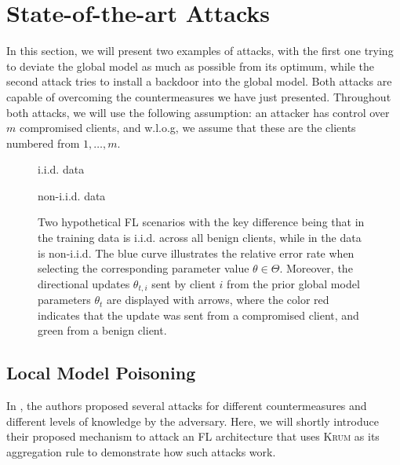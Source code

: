 \documentclass[conference]{IEEEtran}
\begin{document}
\section{State-of-the-art Attacks}\label{sec:attacks}
In this section, we will present two examples of attacks, with the first one trying to deviate the global model as much as possible from its optimum, while the second attack tries to install a backdoor into the global model. Both attacks are capable of overcoming the countermeasures we have just presented. Throughout both attacks, we will use the following assumption: an attacker has control over $m$ compromised clients, and w.l.o.g, we assume that these are the clients numbered from $1, \ldots, m$.

\begin{figure*}
    \centering
    \begin{minipage}[b]{0.49\textwidth}
        \centering
        
        \caption{i.i.d. data}
        \label{fig:outlier_detection_iid}
    \end{minipage}
    \hfill
    \begin{minipage}[b]{0.49\textwidth}
        \centering
        
        \caption{non-i.i.d. data}
        \label{fig:outlier_detection_non_iid}
    \end{minipage}
    \hfill
    \caption*{Two hypothetical FL scenarios with the key difference being that in  the training data is i.i.d. across all benign clients, while in  the data is non-i.i.d. The blue curve illustrates the relative error rate when selecting the corresponding parameter value $\theta \in \Theta$. Moreover, the directional updates $\theta_{t,i}$ sent by client $i$ from the prior global model parameters $\theta_t$ are displayed with arrows, where the color red indicates that the update was sent from a compromised client, and green from a benign client.}
\end{figure*}

\subsection{Local Model Poisoning}
In \cite{Fang2019}, the authors proposed several attacks for different countermeasures and different levels of knowledge by the adversary. Here, we will shortly introduce their proposed mechanism to attack an FL architecture that uses \textsc{Krum} as its aggregation rule to demonstrate how such attacks work.
\end{document}
